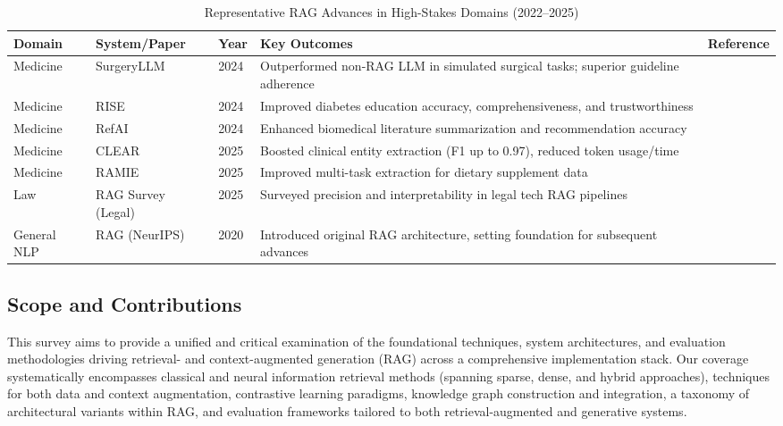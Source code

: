 \documentclass[sigconf]{acmart}
\begin{document}
\begin{table*}[htbp]
\centering
\caption{Representative RAG Advances in High-Stakes Domains (2022--2025)}
\label{tab:rag-examples}
\begin{adjustbox}{max width=\textwidth}
\begin{tabular}{@{}lllll@{}}
\toprule
Domain & System/Paper & Year & Key Outcomes & Reference \\
\midrule
Medicine & SurgeryLLM & 2024 & Outperformed non-RAG LLM in simulated surgical tasks; superior guideline adherence & \cite{ref1} \\
Medicine & RISE & 2024 & Improved diabetes education accuracy, comprehensiveness, and trustworthiness & \cite{ref55} \\
Medicine & RefAI & 2024 & Enhanced biomedical literature summarization and recommendation accuracy & \cite{ref6} \\
Medicine & CLEAR & 2025 & Boosted clinical entity extraction (F1 up to 0.97), reduced token usage/time & \cite{ref3} \\
Medicine & RAMIE & 2025 & Improved multi-task extraction for dietary supplement data & \cite{ref7} \\
Law & RAG Survey (Legal) & 2025 & Surveyed precision and interpretability in legal tech RAG pipelines & \cite{ref63} \\
General NLP & RAG (NeurIPS) & 2020 & Introduced original RAG architecture, setting foundation for subsequent advances & \cite{ref10} \\
\bottomrule
\end{tabular}
\end{adjustbox}
\end{table*}

\subsection{Scope and Contributions}

This survey aims to provide a unified and critical examination of the foundational techniques, system architectures, and evaluation methodologies driving retrieval- and context-augmented generation (RAG) across a comprehensive implementation stack. Our coverage systematically encompasses classical and neural information retrieval methods (spanning sparse, dense, and hybrid approaches), techniques for both data and context augmentation, contrastive learning paradigms, knowledge graph construction and integration, a taxonomy of architectural variants within RAG, and evaluation frameworks tailored to both retrieval-augmented and generative systems.
\end{document}
